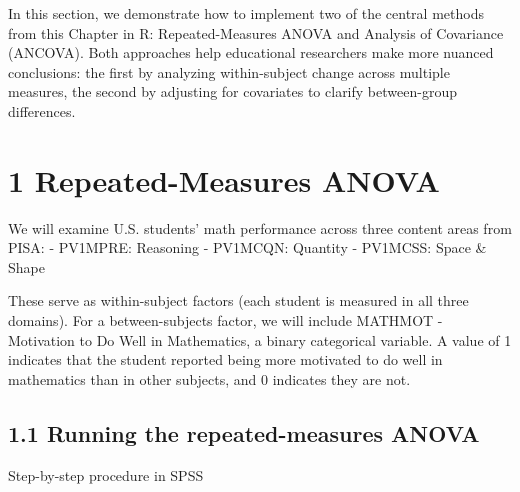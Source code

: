 \documentclass[
  letterpaper,
  DIV=11,
  numbers=noendperiod]{scrreprt}
\begin{document}

In this section, we demonstrate how to implement two of the central
methods from this Chapter in R: Repeated-Measures ANOVA and Analysis of
Covariance (ANCOVA). Both approaches help educational researchers make
more nuanced conclusions: the first by analyzing within-subject change
across multiple measures, the second by adjusting for covariates to
clarify between-group differences.

\section*{1 Repeated-Measures ANOVA}\label{repeated-measures-anova-1}


We will examine U.S. students' math performance across three content
areas from PISA: - PV1MPRE: Reasoning - PV1MCQN: Quantity - PV1MCSS:
Space \& Shape

These serve as within-subject factors (each student is measured in all
three domains). For a between-subjects factor, we will include MATHMOT -
Motivation to Do Well in Mathematics, a binary categorical variable. A
value of 1 indicates that the student reported being more motivated to
do well in mathematics than in other subjects, and 0 indicates they are
not.

\subsection*{1.1 Running the repeated-measures
ANOVA}\label{running-the-repeated-measures-anova-1}

Step-by-step procedure in SPSS
\end{document}
